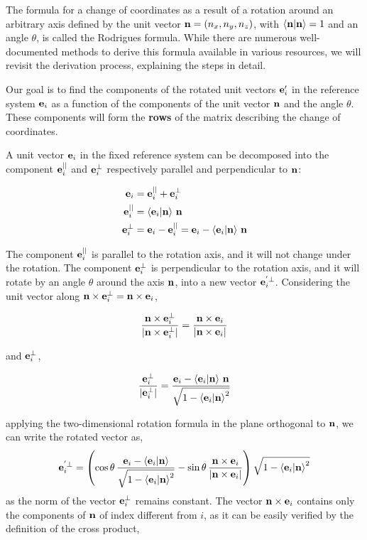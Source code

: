 \documentclass[12pt]{article}
\begin{document}
The formula for a change of coordinates as a result of a rotation around an arbitrary axis
defined by the unit vector $\vb{n} = (n_x, n_y, n_z)$, with $\ip{\vb{n}}{\vb{n}} = 1$
and an angle $\theta$, is called the Rodrigues formula. While there are numerous
well-documented methods to derive this formula available in various resources, we will revisit
the derivation process, explaining the steps in detail.

Our goal is to find the components of the rotated unit vectors $\vb{e}'_i$ in the reference
system $\vb{e}_i$ as a function of the components of the unit vector $\vb{n}$ and the angle
$\theta$. These components will form the \textbf{rows} of the matrix describing the change of
coordinates.

A unit vector $\vb{e}_i$ in the fixed reference system can be decomposed into the component
$\vb{e}_i^{||}$ and $\vb{e}_i^{\perp}$ respectively parallel and perpendicular to $\vb{n}$:

\begin{align}
  \vb{e}_i &= \vb{e}_i^{||} + \vb{e}_i^{\perp} \\
  \vb{e}_i^{||} &= \ip{\vb{e}_i}{\vb{n}}\,\vb{n} \\
  \vb{e}_i^{\perp} &= \vb{e}_i - \vb{e}_i^{||} = \vb{e}_i - \ip{\vb{e}_i}{\vb{n}}\,\vb{n}
\end{align}

The component $\vb{e}_i^{||}$ is parallel to the rotation axis, and it will not change under
the rotation. The component $\vb{e}_i^{\perp}$ is perpendicular to the rotation axis, and it
will rotate by an angle $\theta$ around the axis $\vb{n}$, into a new vector
$\vb{e}_i^{'\perp}$. Considering the unit vector along
$\vb{n} \times \vb{e}_i^{\perp} = \vb{n} \times \vb{e}_i$,

\[
  \frac{\vb{n} \times \vb{e}_i^{\perp}}{|\vb{n} \times \vb{e}_i^{\perp}|}
  = \frac{\vb{n} \times \vb{e}_i}{|\vb{n} \times \vb{e}_i|}
\]

and $\vb{e}_i^{\perp}$,

\[
  \frac{\vb{e}_i^{\perp}}{|\vb{e}_i^{\perp}|}
  = \frac{\vb{e}_i - \ip{\vb{e}_i}{\vb{n}}\,\vb{n}}{\sqrt{1 - \ip{\vb{e}_i}{\vb{n}}^2}}
\]

applying the two-dimensional rotation formula in the plane orthogonal to $\vb{n}$, we can write the
rotated vector as,
\[
  \vb{e}_i^{'\perp} =
  \left(
    \cos\theta\,\frac{\vb{e}_i - \ip{\vb{e}_i}{\vb{n}}}{\sqrt{1 - \ip{\vb{e}_i}{\vb{n}}^2}}
    - \sin\theta\,\frac{\vb{n} \times \vb{e}_i}{|\vb{n} \times \vb{e}_i|}
  \right)\sqrt{1 - \ip{\vb{e}_i}{\vb{n}}^2}
\]
as the norm of the vector $\vb{e}_i^{\perp}$ remains constant. The vector
$\vb{n} \times \vb{e}_i$ contains only the components of $\vb{n}$ of index different from
$i$, as it can be easily verified by the definition of the cross product,
\end{document}
